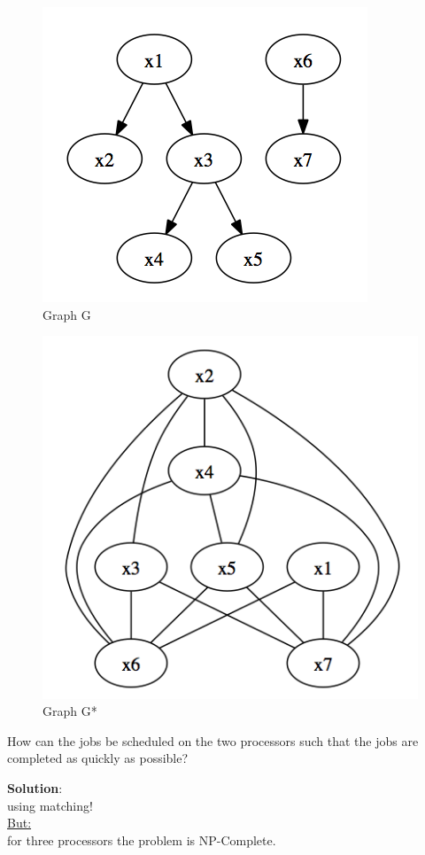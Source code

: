 \begin{example}
\begin{figure}[h]
\centering
\includegraphics[scale=0.4]{diagrams/gapp4.png}
\caption{Graph G}
\end{figure}

\begin{figure}[h]
\centering
\includegraphics[scale=0.4]{diagrams/g2app4.png}
\caption{Graph G*}
\end{figure}
\end{example}

How can the jobs be scheduled on the two processors such that the jobs are completed as quickly as possible?

\textbf{Solution}:\\
using matching!\\
\underline{But:}\\
for three processors the problem is NP-Complete.\\

